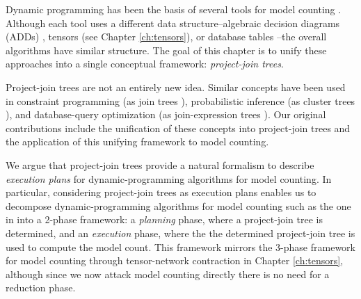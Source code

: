 

Dynamic programming has been the basis of several tools for model counting \cite{DPV20,DDV19,dudek2020parallel,fichte2020exploiting}.
Although each tool uses a different data structure--algebraic decision diagrams (ADDs) \cite{DPV20}, tensors (see Chapter \ref{ch:tensors}), or database tables \cite{fichte2020exploiting}--the overall algorithms have similar structure.
The goal of this chapter is to unify these approaches into a single conceptual framework: \emph{project-join trees}.

Project-join trees are not an entirely new idea.
Similar concepts have been used in constraint programming (as join trees \cite{dechter1989tree}), probabilistic inference (as cluster trees \cite{SAS94}), and database-query optimization (as join-expression trees \cite{MPPV04}).
Our original contributions include the unification of these concepts into project-join trees and the application of this unifying framework to model counting.

We argue that project-join trees provide a natural formalism to describe \emph{execution plans} for dynamic-programming algorithms for model counting.
In particular, considering project-join trees as execution plans enables us to decompose dynamic-programming algorithms for model counting such as the one in \cite{DPV20} into a 2-phase framework: a \emph{planning} phase, where a project-join tree is determined, and an \emph{execution} phase, where the the determined project-join tree is used to compute the model count.
This framework mirrors the 3-phase framework for model counting through tensor-network contraction in Chapter \ref{ch:tensors}, although since we now attack model counting directly there is no need for a reduction phase.

